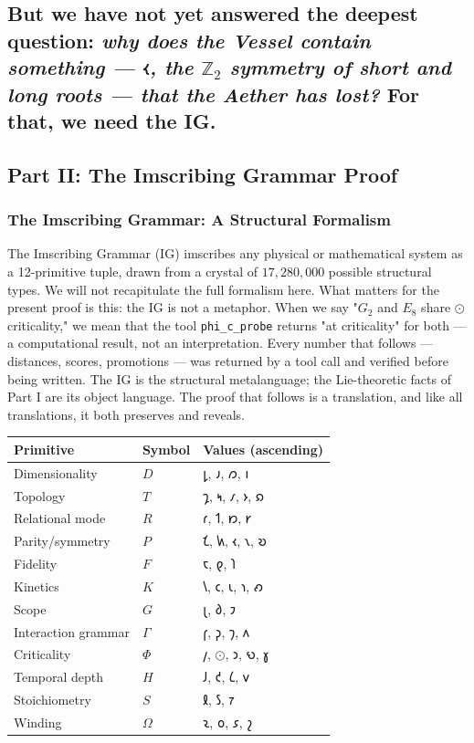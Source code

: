 \documentclass[12pt,a4paper]{article}
\begin{document}
\subsection{But we have not yet answered the deepest question: \emph{why does the Vessel contain something --- $𐑬$, the $\mathbb{Z}_2$ symmetry of short and long roots --- that the Aether has lost?} For that, we need the IG.}

\subsection{Part II: The Imscribing Grammar Proof}

\subsubsection{The Imscribing Grammar: A Structural Formalism}

The Imscribing Grammar (IG) imscribes any physical or mathematical system as a 12-primitive tuple, drawn from a crystal of $17{,}280{,}000$ possible structural types. We will not recapitulate the full formalism here. What matters for the present proof is this: the IG is not a metaphor. When we say "$G_2$ and $E_8$ share $⊙$ criticality," we mean that the tool \texttt{phi\_c\_probe} returns "at criticality" for both --- a computational result, not an interpretation. Every number that follows --- distances, scores, promotions --- was returned by a tool call and verified before being written. The IG is the structural metalanguage; the Lie-theoretic facts of Part I are its object language. The proof that follows is a translation, and like all translations, it both preserves and reveals.

\begin{table}[htbp]
\centering
\small
{}
\begin{tabularx}{\textwidth}{>{\centering\arraybackslash}X >{\centering\arraybackslash}X >{\centering\arraybackslash}X}
\toprule
\rowcolor{gray!25}\textbf{Primitive} & \textbf{Symbol} & \textbf{Values (ascending)} \\
\midrule
\rowcolors{1}{white}{gray!10}
Dimensionality & $D$ & $𐑛$, $𐑨$, $𐑼$, $𐑦$ \\
Topology & $T$ & $𐑡$, $𐑰$, $𐑥$, $𐑶$, $𐑸$ \\
Relational mode & $R$ & $𐑩$, $𐑑$, $𐑽$, $𐑾$ \\
Parity/symmetry & $P$ & $𐑗$, $𐑿$, $𐑬$, $𐑯$, $𐑹$ \\
Fidelity & $F$ & $𐑱$, $𐑞$, $𐑐$ \\
Kinetics & $K$ & $𐑘$, $𐑤$, $𐑧$, $𐑪$, $𐑺$ \\
Scope & $G$ & $𐑚$, $𐑔$, $𐑲$ \\
Interaction grammar & $\Gamma$ & $𐑝$, $𐑜$, $𐑠$, $𐑵$ \\
Criticality & $\Phi$ & $𐑢$, $⊙$, $𐑮$, $𐑻$, $𐑣$ \\
Temporal depth & $H$ & $𐑓$, $𐑒$, $𐑖$, $𐑫$ \\
Stoichiometry & $S$ & $𐑙$, $𐑕$, $𐑳$ \\
Winding & $\Omega$ & $𐑷$, $𐑴$, $𐑭$, $𐑟$ \\
\bottomrule
\end{tabularx}
\end{table}
\end{document}
